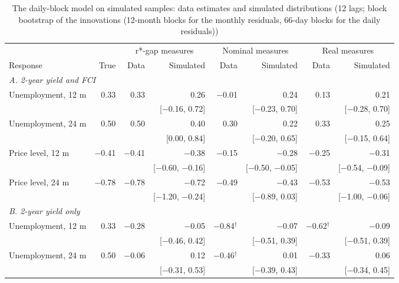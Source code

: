 \begin{table}[p]\centering\footnotesize\setlength{\tabcolsep}{3pt}
\caption{The daily-block model on simulated samples: data estimates and simulated distributions (12 lags; block bootstrap of the innovations (12-month blocks for the monthly residuals, 66-day blocks for the daily residuals))}\label{tab:dailysimblock}
\begin{tabular}{lrrrrrrr}\toprule & & \multicolumn{2}{c}{r*-gap measures} & \multicolumn{2}{c}{Nominal measures} & \multicolumn{2}{c}{Real measures}\\ \cmidrule(lr){3-4}\cmidrule(lr){5-6}\cmidrule(lr){7-8}
Response & True & Data & Simulated & Data & Simulated & Data & Simulated\\ \midrule
\multicolumn{8}{l}{\textit{A. 2-year yield and FCI}}\\
\quad Unemployment, 12 m & 0.33 & 0.33 & 0.26 & $-$0.01 & 0.24 & 0.13 & 0.21\\
 &  &  & {\scriptsize [$-$0.16, 0.72]} &  & {\scriptsize [$-$0.23, 0.70]} &  & {\scriptsize [$-$0.28, 0.70]}\\
\quad Unemployment, 24 m & 0.50 & 0.50 & 0.40 & 0.30 & 0.22 & 0.33 & 0.25\\
 &  &  & {\scriptsize [0.00, 0.84]} &  & {\scriptsize [$-$0.20, 0.65]} &  & {\scriptsize [$-$0.15, 0.64]}\\
\quad Price level, 12 m & $-$0.41 & $-$0.41 & $-$0.38 & $-$0.15 & $-$0.28 & $-$0.25 & $-$0.31\\
 &  &  & {\scriptsize [$-$0.60, $-$0.16]} &  & {\scriptsize [$-$0.50, $-$0.05]} &  & {\scriptsize [$-$0.54, $-$0.09]}\\
\quad Price level, 24 m & $-$0.78 & $-$0.78 & $-$0.72 & $-$0.49 & $-$0.43 & $-$0.53 & $-$0.53\\
 &  &  & {\scriptsize [$-$1.20, $-$0.24]} &  & {\scriptsize [$-$0.89, 0.03]} &  & {\scriptsize [$-$1.00, $-$0.06]}\\
\multicolumn{8}{l}{\textit{B. 2-year yield only}}\\
\quad Unemployment, 12 m & 0.33 & $-$0.28 & $-$0.05 & $-$0.84$^{\dagger}$ & $-$0.07 & $-$0.62$^{\dagger}$ & $-$0.09\\
 &  &  & {\scriptsize [$-$0.46, 0.42]} &  & {\scriptsize [$-$0.51, 0.39]} &  & {\scriptsize [$-$0.51, 0.39]}\\
\quad Unemployment, 24 m & 0.50 & $-$0.06 & 0.12 & $-$0.46$^{\dagger}$ & 0.01 & $-$0.33 & 0.06\\
 &  &  & {\scriptsize [$-$0.31, 0.53]} &  & {\scriptsize [$-$0.39, 0.43]} &  & {\scriptsize [$-$0.34, 0.45]}\\

\end{tabular}
\end{table}
